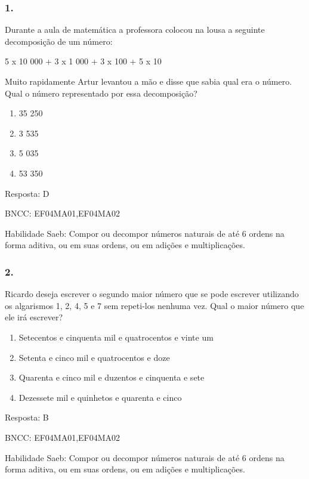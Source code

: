 \subsubsection{1.}\label{section-172}

Durante a aula de matemática a professora colocou na lousa a seguinte
decomposição de um número:

5 x 10 000 + 3 x 1 000 + 3 x 100 + 5 x 10

Muito rapidamente Artur levantou a mão e disse que sabia qual era o
número. Qual o número representado por essa decomposição?

\begin{enumerate}
\def\labelenumi{\alph{enumi})}
\item
  35 250
\item
  3 535
\item
  5 035
\item
  53 350
\end{enumerate}

Resposta: D

BNCC: EF04MA01,EF04MA02

Habilidade Saeb: Compor ou decompor números naturais de até 6 ordens na
forma aditiva, ou em suas ordens, ou em adições e multiplicações.

\subsubsection{2.}\label{section-173}

Ricardo deseja escrever o segundo maior número que se pode escrever
utilizando os algarismos 1, 2, 4, 5 e 7 sem repeti-los nenhuma vez. Qual
o maior número que ele irá escrever?

\begin{enumerate}
\def\labelenumi{\alph{enumi})}
\item
  Setecentos e cinquenta mil e quatrocentos e vinte um
\item
  Setenta e cinco mil e quatrocentos e doze
\item
  Quarenta e cinco mil e duzentos e cinquenta e sete
\item
  Dezessete mil e quinhetos e quarenta e cinco
\end{enumerate}

Resposta: B

BNCC: EF04MA01,EF04MA02

Habilidade Saeb: Compor ou decompor números naturais de até 6 ordens na
forma aditiva, ou em suas ordens, ou em adições e multiplicações.

